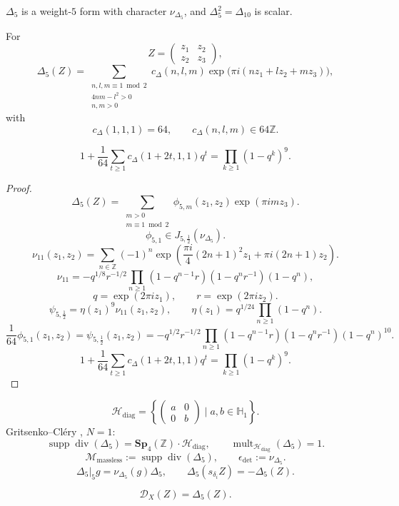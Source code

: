 \documentclass[11pt]{memoir}
\newcommand{\Z}{\mathbb{Z}} \newcommand{\C}{\mathbb{C}}
\newcommand{\Sp}{\mathbf{Sp}}
\begin{document}
$\Delta_5$ is a weight-$5$ form with character
$\nu_{\Delta_5}$, and $\Delta_5^2=\Delta_{10}$ is scalar.

For
$$Z=\begin{pmatrix}z_1&z_2\\z_2&z_3\end{pmatrix},$$
$$\Delta_5(Z) =
\sum_{\substack{n,l,m\equiv 1 \bmod 2\\4nm-l^2>0\\n,m>0}}
c_\Delta(n,l,m)\exp\bigl(\pi i(nz_1+lz_2+mz_3)\bigr),$$
with
$$c_\Delta(1,1,1)=64,\qquad c_\Delta(n,l,m)\in64\Z.$$

\begin{proposition}
$$1+\frac1{64}\sum_{t\geq1}c_\Delta(1+2t,1,1)q^t
=\prod_{k\geq1}(1-q^k)^9.$$
\end{proposition}

\begin{proof}
$$\Delta_5(Z) =
\sum_{\substack{m>0\\m\equiv1\bmod2}}
\phi_{5,m}(z_1,z_2)\exp(\pi i m z_3).$$
$$\phi_{5,1}\in J_{5,\frac12}(\nu_{\Delta_5}).$$
$$\nu_{11}(z_1,z_2)=
\sum_{n\in\Z}(-1)^n
\exp\left(\frac{\pi i}{4}(2n+1)^2z_1+\pi i(2n+1)z_2\right).$$
$$\nu_{11} =
-q^{1/8}r^{-1/2}\prod_{n\geq1}
(1-q^{n-1}r)(1-q^nr^{-1})(1-q^n),$$
$$q=\exp(2\pi iz_1),\qquad r=\exp(2\pi iz_2).$$
$$\psi_{5,\frac12}=\eta(z_1)^9\nu_{11}(z_1,z_2),\qquad
\eta(z_1)=q^{1/24}\prod_{n\geq1}(1-q^n).$$
$$\frac1{64}\phi_{5,1}(z_1,z_2)=\psi_{5,\frac12}(z_1,z_2)
=-q^{1/2}r^{-1/2}\prod_{n\geq1}
(1-q^{n-1}r)(1-q^nr^{-1})(1-q^n)^{10}.$$
$$1+\frac1{64}\sum_{t\geq1}c_\Delta(1+2t,1,1)q^t
=\prod_{k\geq1}(1-q^k)^9.$$
\end{proof}

\begin{definition}
$$\mathcal H_{\mathrm{diag}}
=\left\{\begin{pmatrix}a&0\\0&b\end{pmatrix}\mid
a,b\in\mathbb H_1\right\}.$$
Gritsenko--Cl\'ery \cite{GC}, $N=1$:
$$\operatorname{supp}\operatorname{div}(\Delta_5)
=\Sp_4(\Z)\cdot\mathcal H_{\mathrm{diag}},\qquad
\operatorname{mult}_{\mathcal H_{\mathrm{diag}}}(\Delta_5)=1.$$
$$\mathcal M_{\mathrm{massless}}
:=\operatorname{supp}\operatorname{div}(\Delta_5),\qquad
\epsilon_{\det}:=\nu_{\Delta_5}.$$
$$\Delta_5|_5g=\nu_{\Delta_5}(g)\Delta_5,\qquad
\Delta_5(s_{\delta_i}Z)=-\Delta_5(Z).$$
\end{definition}

\begin{proposition}
$$\mathcal D_X(Z)=\Delta_5(Z).$$
\end{proposition}
\end{document}

